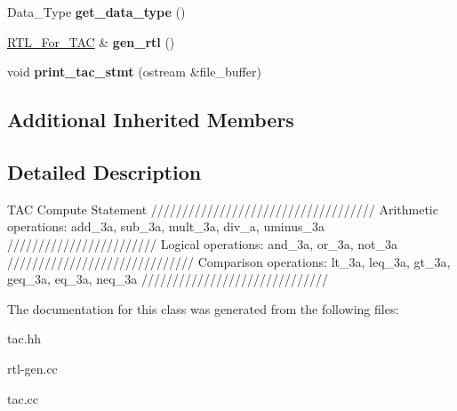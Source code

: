 \begin{DoxyCompactItemize}
\item 
\mbox{\label{classCompute__TAC__Stmt_a656bd44d06df4de10abe2836d801bde1}} 
Data\+\_\+\+Type {\bfseries get\+\_\+data\+\_\+type} ()
\item 
\mbox{\label{classCompute__TAC__Stmt_ae46b480642729802bc78ed3bbe6bb05c}} 
\hyperlink{classRTL__For__TAC}{R\+T\+L\+\_\+\+For\+\_\+\+T\+AC} \& {\bfseries gen\+\_\+rtl} ()
\item 
\mbox{\label{classCompute__TAC__Stmt_ae3781aa58f671f1a330ec1151c927ab3}} 
void {\bfseries print\+\_\+tac\+\_\+stmt} (ostream \&file\+\_\+buffer)
\end{DoxyCompactItemize}
\subsection*{Additional Inherited Members}


\subsection{Detailed Description}
T\+AC Compute Statement //////////////////////////////////// Arithmetic operations\+: add\+\_\+3a, sub\+\_\+3a, mult\+\_\+3a, div\+\_\+a, uminus\+\_\+3a //////////////////////// Logical operations\+: and\+\_\+3a, or\+\_\+3a, not\+\_\+3a ////////////////////////////// Comparison operations\+: lt\+\_\+3a, leq\+\_\+3a, gt\+\_\+3a, geq\+\_\+3a, eq\+\_\+3a, neq\+\_\+3a ////////////////////////////// 

The documentation for this class was generated from the following files\+:\begin{DoxyCompactItemize}
\item 
tac.\+hh\item 
rtl-\/gen.\+cc\item 
tac.\+cc\end{DoxyCompactItemize}

